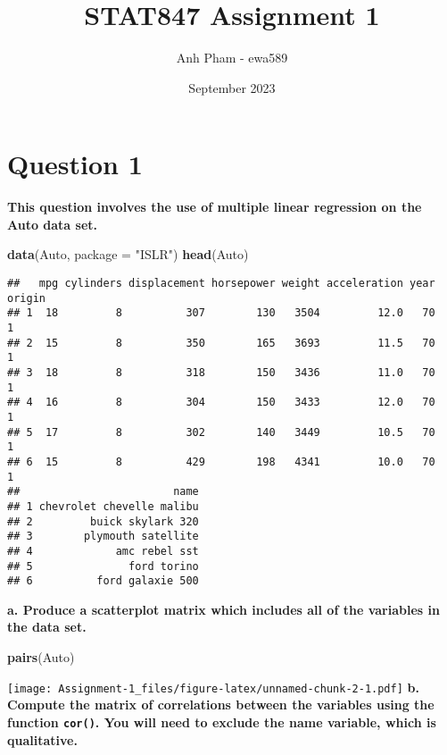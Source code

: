 \documentclass[
]{article}
\title{STAT847 Assignment 1}
\author{Anh Pham - ewa589}
\date{September 2023}
\newenvironment{Shaded}{\begin{snugshade}}{\end{snugshade}}
\newcommand{\AttributeTok}[1]{\textcolor[rgb]{0.13,0.29,0.53}{#1}}
\newcommand{\FunctionTok}[1]{\textcolor[rgb]{0.13,0.29,0.53}{\textbf{#1}}}
\newcommand{\NormalTok}[1]{#1}
\newcommand{\StringTok}[1]{\textcolor[rgb]{0.31,0.60,0.02}{#1}}
\begin{document}
\maketitle

{
\setcounter{tocdepth}{2}
\tableofcontents
}
\hypertarget{question-1}{%
\section{Question 1}\label{question-1}}

\textbf{This question involves the use of multiple linear regression on
the Auto data set.}

\begin{Shaded}
\begin{Highlighting}[]
\FunctionTok{data}\NormalTok{(Auto, }\AttributeTok{package =} \StringTok{"ISLR"}\NormalTok{)}
\FunctionTok{head}\NormalTok{(Auto)}
\end{Highlighting}
\end{Shaded}

\begin{verbatim}
##   mpg cylinders displacement horsepower weight acceleration year origin
## 1  18         8          307        130   3504         12.0   70      1
## 2  15         8          350        165   3693         11.5   70      1
## 3  18         8          318        150   3436         11.0   70      1
## 4  16         8          304        150   3433         12.0   70      1
## 5  17         8          302        140   3449         10.5   70      1
## 6  15         8          429        198   4341         10.0   70      1
##                        name
## 1 chevrolet chevelle malibu
## 2         buick skylark 320
## 3        plymouth satellite
## 4             amc rebel sst
## 5               ford torino
## 6          ford galaxie 500
\end{verbatim}

\textbf{a. Produce a scatterplot matrix which includes all of the
variables in the data set.}

\begin{Shaded}
\begin{Highlighting}[]
\FunctionTok{pairs}\NormalTok{(Auto)}
\end{Highlighting}
\end{Shaded}

\texttt{[image: Assignment-1\_files/figure-latex/unnamed-chunk-2-1.pdf]}
\textbf{b. Compute the matrix of correlations between the variables
using the function \texttt{cor()}. You will need to exclude the name
variable, which is qualitative.}
\end{document}
